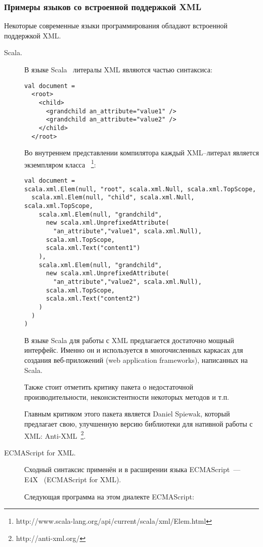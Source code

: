 \subsubsection{Примеры языков со встроенной поддержкой XML}
Некоторые современные языки программирования обладают встроенной поддержкой XML.
\begin{description}
\item[Scala.] В языке Scala~\cite{scala-spec} литералы XML являются частью синтаксиса: \td

\begin{lstlisting}
val document =
  <root>
    <child>
      <grandchild an_attribute="value1" />
      <grandchild an_attribute="value2" />
    </child>
  </root>
\end{lstlisting}
Во внутреннем представлении компилятора каждый XML--литерал является экземпляром класса ~\footnote{http://www.scala-lang.org/api/current/scala/xml/Elem.html}:

\begin{lstlisting}
val document =
scala.xml.Elem(null, "root", scala.xml.Null, scala.xml.TopScope,
  scala.xml.Elem(null, "child", scala.xml.Null, scala.xml.TopScope,
    scala.xml.Elem(null, "grandchild",
      new scala.xml.UnprefixedAttribute(
        "an_attribute","value1", scala.xml.Null),
      scala.xml.TopScope,
      scala.xml.Text("content1")
    ),
    scala.xml.Elem(null, "grandchild",
      new scala.xml.UnprefixedAttribute(
        "an_attribute","value2", scala.xml.Null),
      scala.xml.TopScope,
      scala.xml.Text("content2")
    )
  )
) 
\end{lstlisting}

В языке Scala для работы с XML предлагается достаточно мощный интерфейс. Именно он и используется в многочисленных каркасах для создания веб-приложений (web application frameworks), написанных на Scala. \td

Также стоит отметить критику пакета  о недостаточной производительности, неконсистентности некоторых методов и т.п.

Главным критиком этого пакета является Daniel Spiewak, который предлагает свою, улучшенную версию библиотеки для нативной работы с XML:
Anti-XML~\footnote{http://anti-xml.org/}.

\item[ECMAScript for XML.] Сходный синтаксис применён и в расширении языка ECMAScript~--- E4X~\cite{E4X} (ECMAScript for XML).

Следующая программа на этом диалекте ECMAScript:


\end{description}
